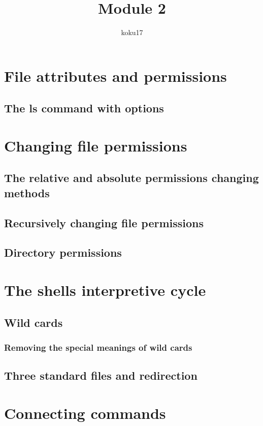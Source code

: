 \documentclass{article}
\author{koku17}
\title{Module 2}
\begin{document}
     \maketitle \newpage
     \tableofcontents \newpage
	\section{File attributes and permissions}
	\subsection{The ls command with options}

	\section{Changing file permissions}
	\subsection{The relative and absolute permissions changing methods}
	\subsection{Recursively changing file permissions}
	\subsection{Directory permissions}

	\section{The shells interpretive cycle}
	\subsection{Wild cards}
	\subsubsection{Removing the special meanings of wild cards}
	\subsection{Three standard files and redirection}

	\section{Connecting commands}
\end{document}
